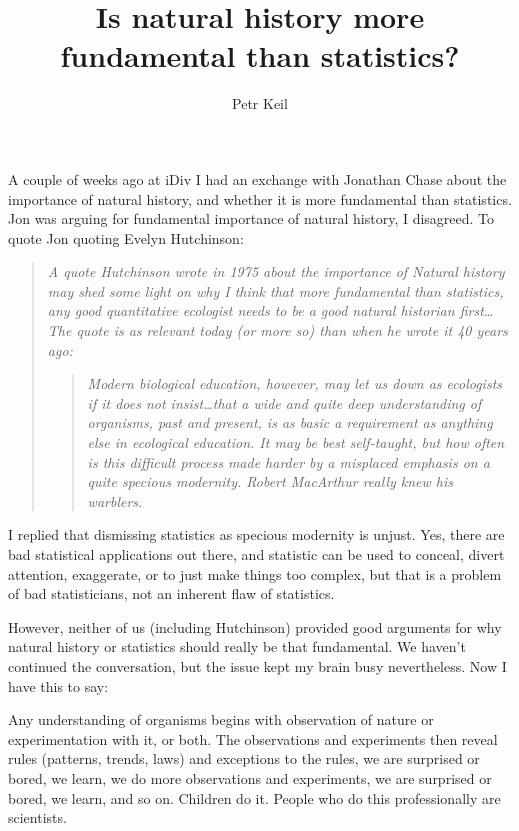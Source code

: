 \documentclass[11pt,a4paper]{article}
\title{Is natural history more fundamental than statistics?}
\author{Petr Keil}
\begin{document}
\maketitle

A couple of weeks ago at iDiv I had an exchange with Jonathan Chase about the importance of natural history, and whether it is more fundamental than statistics. Jon was arguing for fundamental importance of natural history, I disagreed. To quote Jon quoting Evelyn Hutchinson:

\begin{quote}
\textit{A quote Hutchinson wrote in 1975 about the importance of Natural history may shed some light on why I think that more fundamental than statistics, any good quantitative ecologist needs to be a good natural historian first…The quote is as relevant today (or more so) than when he wrote it 40 years ago:}
\begin{quote}
\textit{Modern biological education, however, may let us down as ecologists if it does not insist…that a wide and quite deep understanding of organisms, past and present, is as basic a requirement as anything else in ecological education.  It may be best self-taught, but how often is this difficult process made harder by a misplaced emphasis on a quite specious modernity.  Robert MacArthur really knew his warblers.}
\end{quote} 

\end{quote} 

I replied that dismissing statistics as specious modernity is unjust. Yes, there are bad statistical applications out there, and statistic can be used to conceal, divert attention, exaggerate, or to just make things too complex, but that is a problem of bad statisticians, not an inherent flaw of statistics. 

However, neither of us (including Hutchinson) provided good arguments for why natural history or statistics should really be that fundamental. We haven't continued the conversation, but the issue kept my brain busy nevertheless. Now I have this to say:

Any understanding of organisms begins with observation of nature or experimentation with it, or both. The observations and experiments then reveal rules (patterns, trends, laws) and exceptions to the rules, we are surprised or bored, we learn, we do more observations and experiments, we are surprised or bored, we learn, and so on. Children do it. People who do this professionally are scientists.
\end{document}
